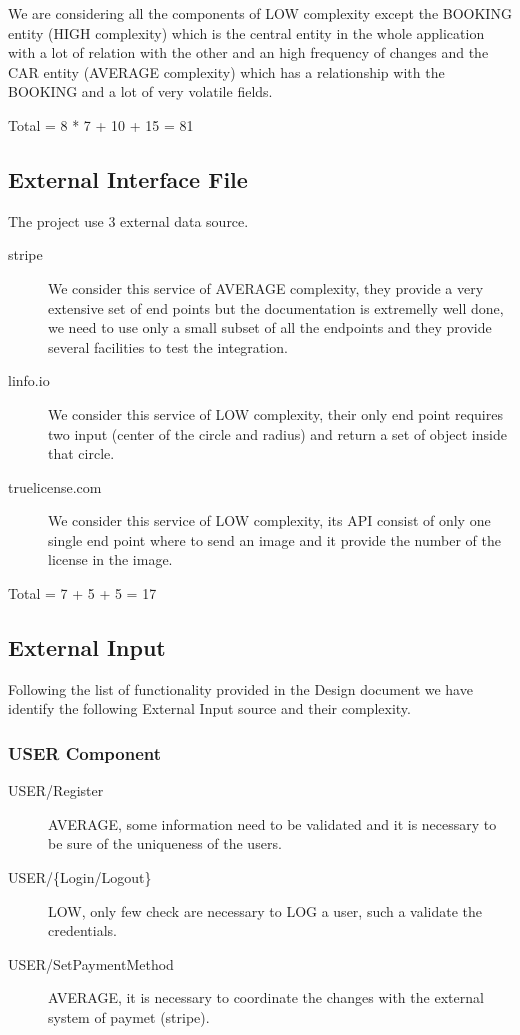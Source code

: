 \documentclass[11pt]{article} %
\begin{document}
We are considering all the components of LOW complexity except the BOOKING entity (HIGH complexity) which is the central entity in the whole application with a lot of relation with the other and an high frequency of changes and the CAR entity (AVERAGE complexity) which has a relationship with the BOOKING and a lot of very volatile fields.

Total = 8 * 7 + 10 + 15 =  81

\subsection{External Interface File}

The project use 3 external data source.

\begin{description}
	\item[stripe] We consider this service of AVERAGE complexity, they provide a very extensive set of end points but the documentation is extremelly well done, we need to use only a small subset of all the endpoints and they provide several facilities to test the integration.
	\item[linfo.io] We consider this service of LOW complexity, their only end point requires two input (center of the circle and radius) and return a set of object inside that circle.
	\item[truelicense.com] We consider this service of LOW complexity, its API consist of only one single end point where to send an image and it provide the number of the license in the image.
\end{description}

Total = 7 + 5 + 5 = 17

\subsection{External Input}

Following the list of functionality provided in the Design document we have identify the following External Input source and their complexity.

\subsubsection{USER Component}

\begin{description}
	\item[USER/Register] AVERAGE, some information need to be validated and it is necessary to be sure of the uniqueness of the users.
	\item[USER/\{Login/Logout\}] LOW, only few check are necessary to LOG a user, such a validate the credentials.
	\item[USER/SetPaymentMethod] AVERAGE, it is necessary to coordinate the changes with the external system of paymet (stripe).
\end{description}
\end{document}
